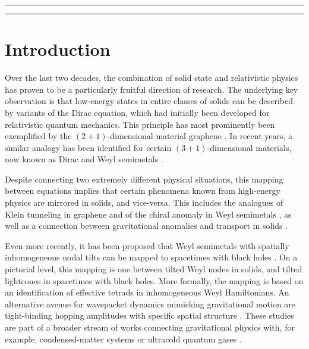 \documentclass[submission, Phys]{SciPost}
\begin{document}
\vspace{10pt}
\noindent\rule{\textwidth}{1pt}
\tableofcontents\thispagestyle{fancy}
\noindent\rule{\textwidth}{1pt}
\vspace{10pt}


\section{Introduction}
\label{sec:intro}
Over the last two decades, the combination of solid state and relativistic physics has proven to be a particularly fruitful direction of research. The underlying key observation is that low-energy states in entire classes of solids can be described by variants of the Dirac equation, which had initially been developed for relativistic quantum mechanics. This principle has most prominently been exemplified by the $(2+1)$-dimensional material graphene \cite{neto2009review}. In recent years, a similar analogy has been identified for certain $(3+1)$-dimensional materials, now known as Dirac and Weyl semimetals \cite{armitage2018review}.

Despite connecting two extremely different physical situations, this mapping between equations implies that certain phenomena known from high-energy physics are mirrored in solids, and vice-versa. This includes the analogues of Klein tunneling in graphene \cite{katsnelson2006kleintunneling} and of the chiral anomaly in Weyl semimetals \cite{adler1969,bell70,nielsen1983,sonspivak2013,Aji2012,behrends2019,knoll2020}, as well as a connection between gravitational anomalies and transport in solids \cite{stone2018mixed,gooth2017experimental,vu2021thermal,bermond2022}. 


Even more recently, it has been proposed that Weyl semimetals with spatially inhomogeneous nodal tilts can be mapped to spacetimes with black holes \cite{huhtala2002,volovik2014,Volovik2016,Weststrom_2017,Guan_2017,Volovik2017,Huang2018,Zubkov_2018,Liang2019,Kedem2020,Hashimoto2020,De_Beule_2021,Sabsovich_2022,konye2022}. On a pictorial level, this mapping is one between tilted Weyl nodes in solids, and tilted lightcones in spacetimes with black holes. More formally, the mapping is based on an identification of effective tetrads in inhomogeneous Weyl Hamiltonians. An alternative avenue for wavepacket dynamics mimicking gravitational motion are tight-binding hopping amplitudes with specific spatial structure \cite{Morice21,morice_2021_dynamics,mertens_unruh_2022}. These studies are part of a broader stream of works connecting gravitational physics with, for example, condensed-matter systems or ultracold quantum gases \cite{unruh2007quantum,Barcel0_2005,VolovikHe,MStone2012,Stone_2013,Roy2018,Hegde2019,Subramanyan_2021, Ma2022}.
\end{document}
